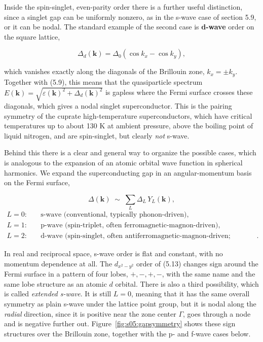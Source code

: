 Inside the spin-singlet, even-parity order there is a further useful distinction, since a singlet
gap can be uniformly nonzero, as in the s-wave case of section 5.9, or it can be nodal. The standard
example of the second case is \textbf{d-wave} order on the square lattice,

\begin{equation}
\Delta_{d}(\mathbf k) = \Delta_0\left(\cos k_x - \cos k_y\right),
\end{equation}

which vanishes exactly along the diagonals of the Brillouin zone, $k_x = \pm k_y$. Together with
(5.9), this means that the quasiparticle spectrum $E(\mathbf k) = \sqrt{\varepsilon(\mathbf k)^2 +
\Delta_d(\mathbf k)^2}$ is gapless where the Fermi surface crosses these diagonals, which gives a
nodal singlet superconductor. This is the pairing symmetry of the cuprate high-temperature
superconductors, which have critical temperatures up to about 130 K at ambient pressure, above the boiling
point of liquid nitrogen, and are spin-singlet, but clearly \emph{not} s-wave.

Behind this there is a clear and general way to organize the possible cases, which is analogous to
the expansion of an atomic orbital wave function in spherical harmonics. We expand the
superconducting gap in an angular-momentum basis on the Fermi surface,

\begin{equation}
\Delta(\mathbf k) \;\sim\; \sum_L \Delta_L\, Y_L(\mathbf k),
\end{equation}
\begin{equation*}
\begin{aligned}
L=0:\quad &\text{s-wave (conventional, typically phonon-driven)},\\
L=1:\quad &\text{p-wave (spin-triplet, often ferromagnetic-magnon-driven)},\\
L=2:\quad &\text{d-wave (spin-singlet, often antiferromagnetic-magnon-driven; cuprates)}.
\end{aligned}
\end{equation*}

In real and reciprocal space, s-wave order is flat and constant, with no momentum dependence at
all. The $d_{x^2-y^2}$ order of (5.13) changes sign around the Fermi surface in a pattern of four
lobes, $+,-,+,-$, with the same name and the same lobe structure as an atomic $d$ orbital. There is
also a third possibility, which is called \emph{extended s-wave}. It is still $L=0$, meaning that it
has the same overall symmetry as plain s-wave under the lattice point group, but it is nodal along
the \emph{radial} direction, since it is positive near the zone center $\Gamma$, goes through a
node and is negative further out. Figure~\ref{fig:s05:gapsymmetry} shows these sign structures over
the Brillouin zone, together with the p- and f-wave cases below.


